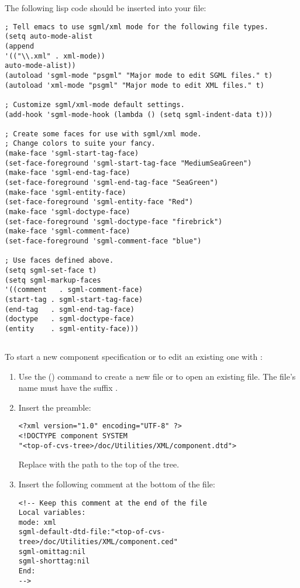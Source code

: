 \documentclass[11pt]{article}
\begin{document}
{The following lisp code should be inserted into your 
file:

\begin{verbatim}
; Tell emacs to use sgml/xml mode for the following file types.
(setq auto-mode-alist
(append
'(("\\.xml" . xml-mode))
auto-mode-alist))
(autoload 'sgml-mode "psgml" "Major mode to edit SGML files." t)
(autoload 'xml-mode "psgml" "Major mode to edit XML files." t) 

; Customize sgml/xml-mode default settings.
(add-hook 'sgml-mode-hook (lambda () (setq sgml-indent-data t)))

; Create some faces for use with sgml/xml mode.
; Change colors to suite your fancy.
(make-face 'sgml-start-tag-face) 
(set-face-foreground 'sgml-start-tag-face "MediumSeaGreen") 
(make-face 'sgml-end-tag-face) 
(set-face-foreground 'sgml-end-tag-face "SeaGreen") 
(make-face 'sgml-entity-face) 
(set-face-foreground 'sgml-entity-face "Red") 
(make-face 'sgml-doctype-face) 
(set-face-foreground 'sgml-doctype-face "firebrick") 
(make-face 'sgml-comment-face) 
(set-face-foreground 'sgml-comment-face "blue") 

; Use faces defined above.
(setq sgml-set-face t)
(setq sgml-markup-faces 
'((comment   . sgml-comment-face) 
(start-tag . sgml-start-tag-face) 
(end-tag   . sgml-end-tag-face) 
(doctype   . sgml-doctype-face) 
(entity    . sgml-entity-face))) 
\end{verbatim}

\subsection{\SUBSECgettingStarted}
\label{\SUBSECgettingStarted}

To start a new component specification or to edit an existing one with
\emacs{}:

\begin{enumerate}
\item Use the  () command to create a
  new file or to open an existing file.  The file's name must have the
  suffix .
\item Insert the preamble:
\begin{verbatim}
<?xml version="1.0" encoding="UTF-8" ?>
<!DOCTYPE component SYSTEM 
"<top-of-cvs-tree>/doc/Utilities/XML/component.dtd">
\end{verbatim}
  Replace  with the path to the top of the
  \sr{} \cvs{} tree.
\item Insert the following \xml{} comment at the bottom of the file:
\begin{verbatim}
<!-- Keep this comment at the end of the file
Local variables:
mode: xml
sgml-default-dtd-file:"<top-of-cvs-tree>/doc/Utilities/XML/component.ced"
sgml-omittag:nil
sgml-shorttag:nil
End:
-->
\end{verbatim}
  

\end{enumerate}}
\end{document}
